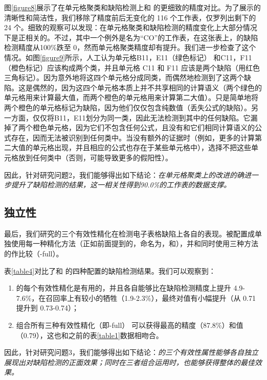图\ref{figure8}展示了在单元格聚类和缺陷检测上\wa 和 \cu 的更细致的精度对比。为了展示的清晰性和简洁性，我们移除了精度前后无变化的 116 个工作表，仅罗列出剩下的 24 个。细致的观察可以发现：在单元格聚类和缺陷检测的精度变化上大部分情况下是正相关的。不过，其中一个例外是名为“CO”的工作表，在这张表上，\wa 的缺陷检测精度从100\%跌至 0，然而单元格聚类精度却有提升。我们进一步检查了这个情况。如图\ref{figure9}所示，人工认为单元格{B11，E11}（绿色标记） 和{C11，F11}（橙色标记）应该构成两个类，并且单元格 C11 和 F11 应该是两个缺陷（用红色三角标记）。\cu 因为意外地将这四个单元格分成同类，而偶然地检测到了这两个缺陷。这是偶然的，因为这四个单元格本质上并不共享相同的计算语义（两个绿色的单元格用来计算最大值，而两个橙色的单元格用来计算第二大值）。\cu 只是简单地将两个橙色的单元格标记为缺陷，因为他们仅仅包含纯数值（丢失公式的缺陷）。另一方面，\wa 仅仅将{B11，E11}划分为同一类，因此无法检测到其中的任何缺陷。它漏掉了两个橙色单元格，因为它们不包含任何公式，且没有和它们相同计算语义的公式存在，因而无法被识别到任何类中。当没有额外的证据时（例如，更多的计算第二大值的单元格出现，并且相应的公式也存在于某些单元格中），\wa 选择不把这些单元格放到任何类中（否则，可能导致更多的假阳性）。

因此，针对研究问题2，我们能够得出如下结论：\textit{\wa 在单元格聚类上的改进的确进一步提升了缺陷检测的结果，这一相关性得到90.0\%的工作表的数据支撑。}


\subsection{独立性}



最后，我们研究\wa 的三个有效性精化在检测电子表格缺陷上各自的表现。\wa 被配置成单独使用每一种精化方法（正如前面提到的，命名为\wasc，\wamc 和\wawc ），并和同时使用三种方法的\wa 作比较（\wa -full）。

表\ref{table4}对比了\cu 和 \wa 的四种配置的缺陷检测结果。我们可以观察到：
\begin{enumerate}
    \item \wa 的每个有效性精化是有用的，并且各自能够比\cu 在缺陷检测精度上提升 4.9-7.6\%，在召回率上有较小的牺牲（1.9-2.3\%），最终对\fmd 值有小幅提升（从 0.71 提升到 0.73-0.74）；
    \item 组合所有三种有效性精化（即\wa -full） 可以获得最高的精度（87.8\%）和\fmd 值（0.79），这也和之前的表\ref{table1}数据相吻合。
\end{enumerate}

因此，针对研究问题3，我们能够得出如下结论：\textit{\wa 的三个有效性属性能够各自独立展现出对缺陷检测的正面效果；同时在三者组合运用时，也能够获得整体的最佳效果。}